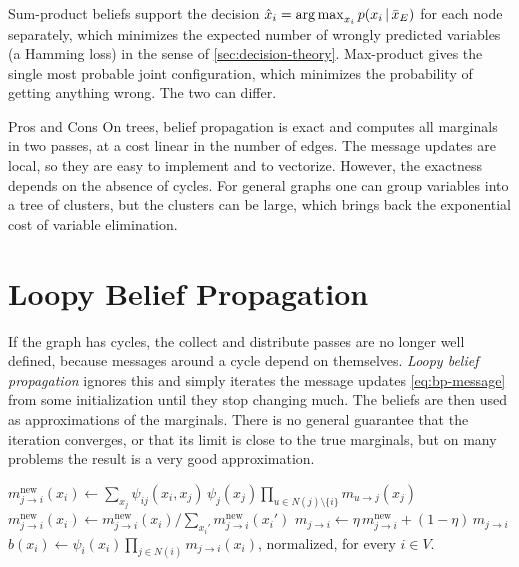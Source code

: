 \begin{remark}
Sum-product beliefs support the decision $\hat x_i=\operatorname*{arg\,max}_{x_i}p(x_i\,|\,\bar x_E)$ for each node separately, which minimizes the expected number of wrongly predicted variables (a Hamming loss) in the sense of \cref{sec:decision-theory}. Max-product gives the single most probable joint configuration, which minimizes the probability of getting anything wrong. The two can differ.
\end{remark}

\begin{notebox}{Pros and Cons}
On trees, belief propagation is exact and computes all marginals in two passes, at a cost linear in the number of edges. The message updates are local, so they are easy to implement and to vectorize. However, the exactness depends on the absence of cycles. For general graphs one can group variables into a tree of clusters, but the clusters can be large, which brings back the exponential cost of variable elimination.
\end{notebox}

\section{Loopy Belief Propagation}\label{sec:loopy-bp}

If the graph has cycles, the collect and distribute passes are no longer well defined, because messages around a cycle depend on themselves. \emph{Loopy belief propagation} ignores this and simply iterates the message updates \eqref{eq:bp-message} from some initialization until they stop changing much. The beliefs are then used as approximations of the marginals. There is no general guarantee that the iteration converges, or that its limit is close to the true marginals, but on many problems the result is a very good approximation.

\begin{algorithm}[H]
\caption{Loopy Belief Propagation with Damping}\label{alg:loopy-bp}
\begin{algorithmic}[1]
\Input{A pairwise MRF on a graph $G=(V,E)$ (cycles allowed) with potentials $\psi_i,\psi_{ij}$; damping parameter $\eta\in(0,1]$; number of iterations $T$.}
    \State $m^{\mathrm{new}}_{j\to i}(x_i)\gets\sum_{x_j}\psi_{ij}(x_i,x_j)\,\psi_j(x_j)\prod_{u\in N(j)\setminus\{i\}}m_{u\to j}(x_j)$
    \State $m^{\mathrm{new}}_{j\to i}(x_i)\gets m^{\mathrm{new}}_{j\to i}(x_i)\big/\sum_{x_i'}m^{\mathrm{new}}_{j\to i}(x_i')$ 
    \State $m_{j\to i}\gets\eta\,m^{\mathrm{new}}_{j\to i}+(1-\eta)\,m_{j\to i}$ 
  \EndFor
\EndFor
\State $b(x_i)\gets\psi_i(x_i)\prod_{j\in N(i)}m_{j\to i}(x_i)$, normalized, for every $i\in V$.
\end{algorithmic}
\end{algorithm}

